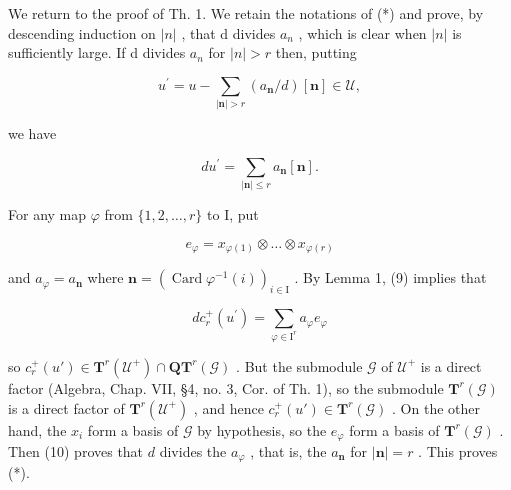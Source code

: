 We return to the proof of Th. 1. We retain the notations of (*) and prove, by descending induction on \(|n|\) , that d divides \(a_{n}\) , which is clear when \(|n|\) is sufficiently large. If d divides \(a_{n}\) for \(|n| > r\) then, putting

\[
u ^ {\prime} = u - \sum_ {| \mathbf {n} | > r} (a _ {\mathbf {n}} / d) [ \mathbf {n} ] \in \mathcal {U},
\]

we have

\[
d u ^ {\prime} = \sum_ {| \mathbf {n} | \leq r} a _ {\mathbf {n}} [ \mathbf {n} ].\tag{9}
\]

For any map \(\varphi\) from \(\{1,2,\ldots,r\}\) to I, put

\[
e _ {\varphi} = x _ {\varphi (1)} \otimes \dots \otimes x _ {\varphi (r)}
\]

and \(a_{\varphi} = a_{\mathbf{n}}\) where \(\mathbf{n} = (\operatorname{Card}\varphi^{-1}(i))_{i\in \mathrm{I}}\) . By Lemma 1, (9) implies that

\[
d c _ {r} ^ {+} (u ^ {\prime}) = \sum_ {\varphi \in \mathrm{I} ^ {r}} a _ {\varphi} e _ {\varphi}\tag{10}
\]

so \(c_r^+(u') \in \mathbf{T}^r(\mathcal{U}^+) \cap \mathbf{Q}\mathbf{T}^r(\mathcal{G})\) . But the submodule \(\mathcal{G}\) of \(\mathcal{U}^+\) is a direct factor (Algebra, Chap. VII, §4, no. 3, Cor. of Th. 1), so the submodule \(\mathbf{T}^r(\mathcal{G})\) is a direct factor of \(\mathbf{T}^r(\mathcal{U}^+)\) , and hence \(c_r^+(u') \in \mathbf{T}^r(\mathcal{G})\) . On the other hand, the \(x_i\) form a basis of \(\mathcal{G}\) by hypothesis, so the \(e_\varphi\) form a basis of \(\mathbf{T}^r(\mathcal{G})\) . Then (10) proves that \(d\) divides the \(a_\varphi\) , that is, the \(a_{\mathbf{n}}\) for \(|\mathbf{n}| = r\) . This proves (*).
\relax{}
